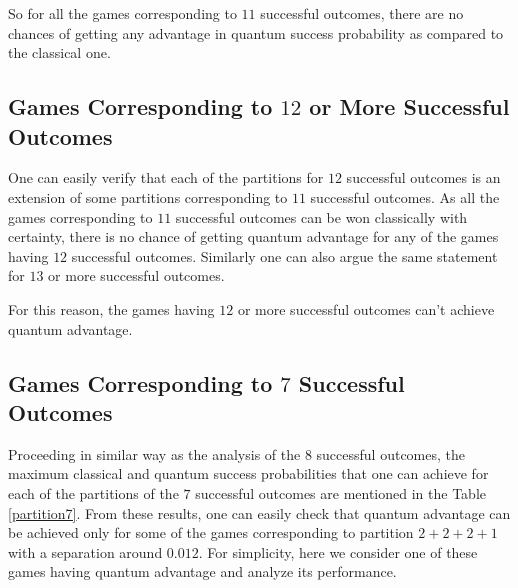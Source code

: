 \documentclass[]{svjour3}
\begin{document}
So for all the games corresponding to $11$ successful outcomes, there are no chances of getting any advantage in quantum success probability as compared to the classical one.



\subsection{Games Corresponding to $12$ or More Successful Outcomes}


One can easily verify that each of the partitions for $12$ successful outcomes is an extension of some partitions corresponding to $11$ successful outcomes. As all the games corresponding to $11$ successful outcomes can be won classically with certainty, there is no chance of getting quantum advantage for any of the games having $12$ successful outcomes. Similarly one can also argue the same statement for $13$ or more successful outcomes.

For this reason, the games having $12$ or more successful outcomes can't achieve quantum advantage.

\subsection{Games Corresponding to $7$ Successful Outcomes}


Proceeding in similar way as the analysis of the $8$ successful outcomes, the maximum classical and quantum success probabilities that one can achieve for each of the partitions of the $7$ successful outcomes are mentioned in the Table \ref{partition7}. From these results, one can easily check that quantum advantage can be achieved only for some of the games corresponding to partition $2+2+2+1$ with a separation around $0.012$. For simplicity, here we consider one of these games having quantum advantage and analyze its performance.\\


\begin{table}[htb]
	\begin{center}
		\setlength{\tabcolsep}{0.35em}
	\end{center}
	\caption{Analysis of partitions for $7$ successful outcomes} 
	\label{partition7}
\end{table}
\end{document}
